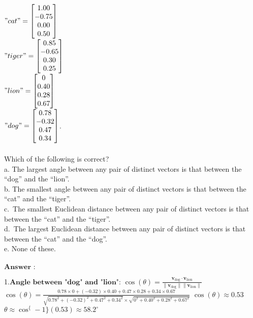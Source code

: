 \documentclass[11pt]{article}
\begin{document}
$"cat"=\begin{bmatrix} 1.00 \\ -0.75 \\ 0.00 \\ 0.50 \end{bmatrix}$\\
$"tiger"=\begin{bmatrix} 0.85 \\ -0.65 \\ 0.30 \\ 0.25 \end{bmatrix}$\\
$"lion"=\begin{bmatrix} 0 \\ 0.40 \\ 0.28 \\ 0.67 \end{bmatrix}$\\
$"dog"=\begin{bmatrix} 0.78 \\ -0.32 \\ 0.47 \\ 0.34 \end{bmatrix}$.\\
~\\
Which of the following is correct?\\
a. The largest angle between any pair of distinct vectors is that
between the ``dog'' and the ``lion''.\\
b. The smallest angle between any pair of distinct vectors is that
between the ``cat'' and the ``tiger''.\\
c.~The smallest Euclidean distance between any pair of distinct vectors
is that between the ``cat'' and the ``tiger''.\\
d.~The largest Euclidean distance between any pair of distinct vectors
is that between the ``cat'' and the ``dog''.\\
e. None of these.\\
~\\
$\textbf{Answer :}$

    1.$ \textbf{Angle between "dog" and "lion":}$ $ \cos(\theta) =
\frac{{\mathbf{v}_{\text{dog}} \cdot \mathbf{v}_{\text{lion}}}}{{\|\mathbf{v}_{\text{dog}}\| \|\mathbf{v}_{\text{lion}}\|}}
$ $ \cos(\theta) =
\frac{{0.78 \times 0 + (-0.32) \times 0.40 + 0.47 \times 0.28 + 0.34 \times 0.67}}{{\sqrt{0.78^2 + (-0.32)^2 + 0.47^2 + 0.34^2} \times \sqrt{0^2 + 0.40^2 + 0.28^2 + 0.67^2}}}
$ $ \cos(\theta) \approx 0.53 $ $
\theta \approx \cos^\{-1\}(0.53) \approx 58.2^\circ $
\end{document}

